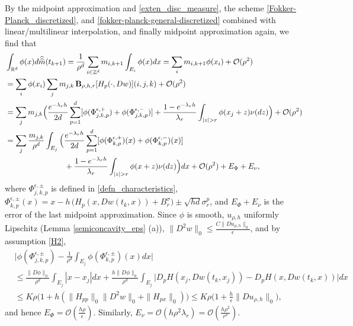 \documentclass[a4paper,  twoside, 10pt, leqno]{amsart}
\newcommand{\zd}{\mathbb{Z}^d}
\newcommand{\rd}{\mathbb{R}^d}
\theoremstyle{remark}
\theoremstyle{definition}
\begin{document}
By the midpoint approximation and \eqref{exten_disc_measure}, the scheme \eqref{Fokker-Planck_discretized}, %
  and \eqref{fokker-planck-general-discretized} combined with linear/multilinear interpolation, and finally midpoint approximation again, we find that
\begin{align*}
& \int_{\rd} \phi(x) d\widehat{\widehat{m}}(t_{k+1}) =  \frac{1}{\rho^d} \sum_{i\in \zd} m_{i,k+1}  \int_{E_i} \phi(x)dx = \sum_{i} m_{i,k+1} \phi(x_i) + \mathcal{O} (\rho^2) \\
& = \sum_{i} \phi(x_i) \sum_{j} m_{j,k} \, \mathbf{B}_{\rho,h,r} [ H_{p} ( \cdot, Dw ) ] ( i,j,k ) + \mathcal{O} (\rho^2)\\
& =  \sum_j m_{j,k} \Big( \frac{e^{-\lambda_r h}}{2d}\sum_{p=1}^d  [ \phi(\Phi_{j,k,p}^{\epsilon,+})+ \phi(\Phi_{j,k,p}^{\epsilon,-})  ]
+ \frac{1-e^{-\lambda_r h}}{\lambda_r} \int_{|z|>r} \phi(x_j+z) \nu(dz) \Big)
+ \mathcal{O} (\rho^2)\\
&=\sum_j \frac{m_{j,k}}{\rho^d} \int_{E_j} \Big( \frac{e^{-\lambda_r h}}{2d}\sum_{p=1}^d [\phi(\Phi_{k,p}^{\epsilon,+})(x)+ \phi(\Phi_{k,p}^{\epsilon,-})(x)] \\
&\hspace{2.7cm}  + \frac{1-e^{-\lambda_r h}}{\lambda_r} \int_{|z|>r} \phi(x+z) \nu(dz) \Big) dx +  \mathcal{O} (\rho^2) +E_\Phi+E_\nu,
\end{align*}
where $\Phi_{j,k,p}^{\epsilon,\pm}$ is defined in \eqref{defn_characteristics}, $\Phi^{\epsilon,\pm}_{k,p}(x) = x - h\,\big( 
  H_{p} ( x, D w (t_k,x) ) + B_r^{\sigma} \big)
 \pm \sqrt{hd} \sigma_r^p$, and $E_\Phi+E_\nu$ is the error of the last midpoint approximation. 
 Since $\phi$ is  smooth, $u_{\rho,h}$ uniformly Lipschitz (Lemma \ref{semiconcavity_eps} (a)), $\|D^2w\|_{0}\leq \frac{C \|Du_{\rho,h}\|_{0}}{\epsilon}$, and by assumption \ref{H2},
\begin{align*}
& \Big| \phi(\Phi^{\epsilon,\pm}_{j,k,p}) - \frac{1}{\rho^d} \int_{E_j} \phi(\Phi^{\epsilon,\pm}_{k,p})(x) dx \Big| \\
& \leq \frac{\|D\phi\|_0}{\rho^d} \int_{E_j} |x-x_j| dx + \frac{h\|D\phi\|_0}{\rho^d} \int_{E_j} \big|D_p H(x_j, Dw(t_k,x_j)) - D_p H(x, Dw(t_k,x))\big| dx \\
& \leq  K \rho \big(1+ h (\| H_{pp}\|_{0}\| D^2 w\|_0 + \|H_{px}\|_0)\big)
\leq K\rho \big(1+ \frac{h}{\epsilon} \|D u_{\rho,h} \|_0\big),
\end{align*}
and hence $E_\Phi=\mathcal{O}(\frac{h\rho}{\epsilon})$. Similarly, $E_\nu=\mathcal{O}(h\rho^2\lambda_r)=\mathcal{O}(\frac{h\rho^2}{r^{\sigma}})$.
\end{document}
